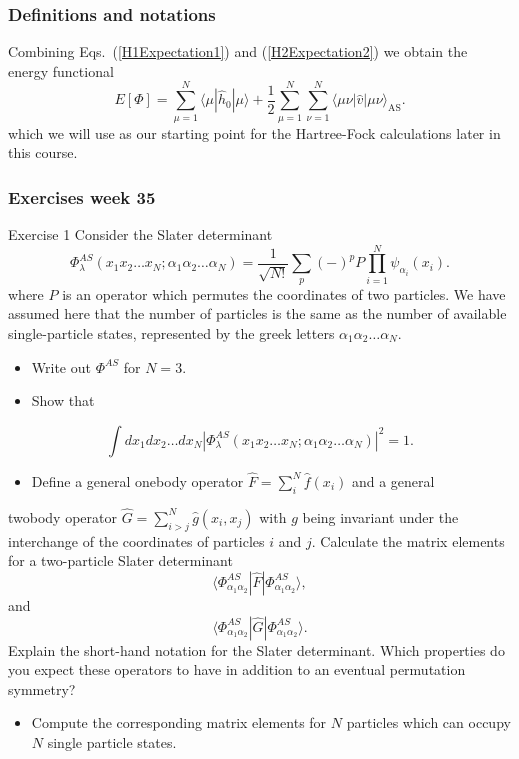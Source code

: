\documentclass{beamer}
\begin{document}
\begin{frame}
\frametitle{Definitions and notations}

\begin{block}{}
Combining Eqs.~(\ref{H1Expectation1}) and
(\ref{H2Expectation2}) we obtain the energy functional 
\begin{equation}
  E[\Phi] 
  = \sum_{\mu=1}^N \langle \mu | \hat{h}_0 | \mu \rangle +
  \frac{1}{2}\sum_{{\mu}=1}^N\sum_{{\nu}=1}^N \langle \mu\nu|\hat{v}|\mu\nu\rangle_{\mathrm{AS}}.
\label{FunctionalEPhi}
\end{equation}
which we will use as our starting point for the Hartree-Fock calculations later in this course. 
\end{block}
\end{frame}

\begin{frame}
\frametitle{Exercises week 35}

\begin{block}{Exercise 1 }
Consider the Slater determinant
\[
\Phi_{\lambda}^{AS}(x_{1}x_{2}\dots x_{N};\alpha_{1}\alpha_{2}\dots\alpha_{N})
=\frac{1}{\sqrt{N!}}\sum_{p}(-)^{p}P\prod_{i=1}^{N}\psi_{\alpha_{i}}(x_{i}).
\]
where $P$ is an operator which permutes the coordinates of two particles. We have assumed here that the 
number of particles is the same as the number of available single-particle states, represented by the
greek letters $\alpha_{1}\alpha_{2}\dots\alpha_{N}$.
\begin{itemize}
\item Write  out $\Phi^{AS}$ for $N=3$.  

\item Show that
\end{itemize}

\noindent
\[
\int dx_{1}dx_{2}\dots dx_{N}\left\vert
\Phi_{\lambda}^{AS}(x_{1}x_{2}\dots x_{N};\alpha_{1}\alpha_{2}\dots\alpha_{N})
\right\vert^{2} = 1.
\]
\begin{itemize}
\item Define a general onebody operator $\hat{F} = \sum_{i}^N\hat{f}(x_{i})$ and a general 
\end{itemize}

\noindent
twobody operator $\hat{G}=\sum_{i>j}^N\hat{g}(x_{i},x_{j})$
with $g$ being invariant under the interchange of the coordinates of particles $i$ and $j$.
Calculate the matrix elements for a two-particle Slater determinant
\[
\langle\Phi_{\alpha_{1}\alpha_{2}}^{AS}|\hat{F}|\Phi_{\alpha_{1}\alpha_{2}}^{AS} \rangle,
\]
and
\[
\langle \Phi_{\alpha_{1}\alpha_{2}}^{AS}|\hat{G}|\Phi_{\alpha_{1}\alpha_{2}}^{AS}\rangle.
\]
Explain the short-hand notation for the Slater determinant.
Which properties do you expect these operators to have in addition to an eventual permutation
symmetry?
\begin{itemize}
\item Compute the corresponding matrix elements for $N$ particles which can occupy $N$ single particle states.
\end{itemize}

\noindent
\end{block}
\end{frame}
\end{document}
